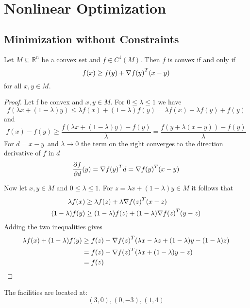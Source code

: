 
\newpage
\section{Nonlinear Optimization}
\subsection{Minimization without Constraints}


\begin{lemma}\label{thm:lemma_gradient_inequality}
Let \(M \subseteq \mathbb{R}^n \) be a convex set and \(f \in C^1(M)\). Then \(f\) is convex if and only if
\[
    f(x) \ge f(y) + \nabla {f(y)}^T (x - y)
\]  
for all \(x, y \in M \). 
\end{lemma}

\begin{proof}
Let f be convex and \(x, y \in M\). For \( 0 \le \lambda \le 1 \) we have
\[ 
    f(\lambda x + (1 - \lambda) y) \le \lambda f(x) + (1 - \lambda)f(y) =  \lambda f(x) - \lambda f(y) + f(y) 
\] 
and 
\[ 
    f(x) - f(y) \ge \frac{f(\lambda x + (1 - \lambda) y) - f(y)}{\lambda}
        = \frac{f(y + \lambda (x - y)) - f(y)}{\lambda}
\]
For \( d = x - y \)\ and \( \lambda \to 0 \) the term on the right converges to the direction derivative of \( f \)
in \( d \)
\[
    \frac{\partial f}{\partial d}(y) = \nabla{f(y)}^T d = \nabla{f(y)}^T (x - y) 
\]

Now let \( x, y \in M \) and  \( 0 \le \lambda \le 1 \). For \( z = \lambda x + (1 - \lambda) y \in M \) it follows that
\[
    \begin{split}
        \lambda f(x) & \ge \lambda f(z) + \lambda \nabla {f(z)}^T (x - z) \\
            (1 - \lambda) f(y) & \ge (1 - \lambda) f(z) + (1 - \lambda) \nabla {f(z)}^T (y - z)
    \end{split}
\]
Adding the two inequalities gives
\[
    \begin{split}
       \lambda f(x) + (1 - \lambda) f(y) 
            & \ge f(z) + \nabla {f(z)}^T(\lambda x - \lambda z + (1- \lambda) y - (1-\lambda)z) \\
            & = f(z) + \nabla {f(z)}^T(\lambda x + (1- \lambda) y - z) \\
            & = f(z)
    \end{split}
\]
\end{proof}
\bigskip


\begin{exercise}
The facilities are located at:
\[
    (3, 0), (0, -3), (1, 4) 
\]
\end{exercise}

